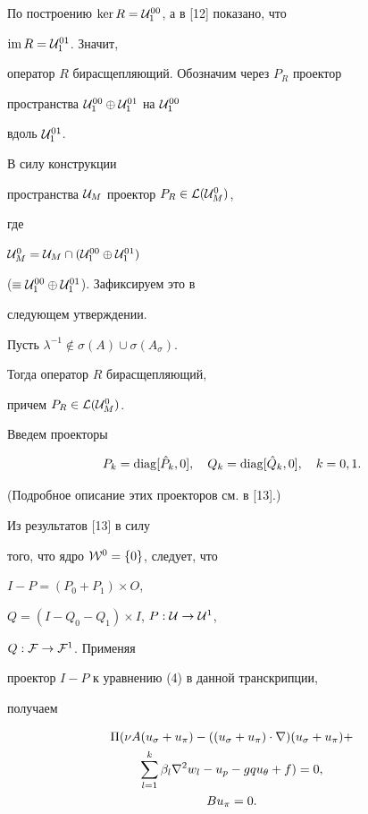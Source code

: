 По построению $\ker R={\cal U}_1^{00}$, а в [12] показано, что


$\operatorname{im} R={\cal U}_1^{01}$. Значит,


оператор $R$ бирасщепляющий. Обозначим через $P_R$ проектор


пространства ${\cal U}_1^{00} \oplus {\cal U}_1^{01}$ на ${\cal U}_1^{00}$


вдоль ${\cal U}_1^{01}$.


В силу конструкции


пространства ${\cal U}_M$ проектор $P_R \in {\cal L} ({\cal U}^0_M)$,


где


${\cal U}^0_M={\cal U}_M \cap ({\cal U}_1^{00} \oplus {\cal U}_1^{01})$


($\equiv{\cal U}_1^{00} \oplus {\cal U}_1^{01}$). Зафиксируем это в


следующем утверждении.





\begin{lem}


Пусть ${\lambda}^{-1} \notin \sigma (A) \cup \sigma (A_{\sigma})$.


Тогда оператор $R$ бирасщепляющий, 


причем $P_R \in {\cal L} ({\cal U}^0_M)$.


\end{lem}





Введем проекторы


$$


P_k=\diag [\Hat P_k, 0],\quad Q_k=\diag


[\Hat Q_k, 0],\quad k=0,1.


$$


(Подробное описание этих проекторов см. в [13].)


Из результатов [13] в силу


того, что ядро ${\cal W}^0=\{0 \}$, следует, что


$I-P=(P_0+P_1) \times O$,


$Q=(I- Q_0 - Q_1) \times I$, $P: {\cal U} \to {\cal U}^1$,


$Q: {\cal F} \to {\cal F}^1$. Применяя


проектор $I-P$ к уравнению (4) в данной транскрипции,


получаем


\begin{gather}


\Pi (\nu A (u_{\sigma}+u_{\pi}) - ((u_{\sigma}+u_{\pi}) \cdot \nabla)


(u_{\sigma}+u_{\pi})+\notag \\


%


\sum_{l=1}^k {\beta}_l {\nabla}^2 w_l- u_p - g q u_{\theta}+f)=0,\\


%


B u_{\pi}=0.\notag


\end{gather}


